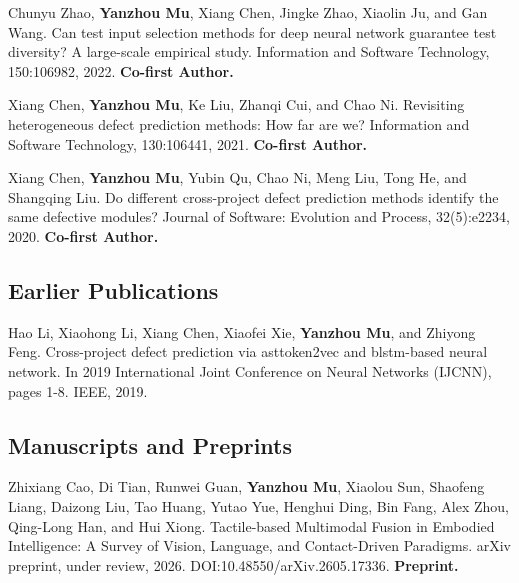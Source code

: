 \documentclass[a4paper,11pt]{article}
\begin{document}
    \vspace{2mm}
    \item {Chunyu Zhao, \textbf{Yanzhou Mu}, Xiang Chen, Jingke Zhao, Xiaolin Ju, and Gan Wang. Can test input selection methods for deep neural network guarantee test diversity? A large-scale empirical study. Information and Software Technology, 150:106982, 2022. \textbf{Co-first Author.}}

    \vspace{2mm}
    \item {Xiang Chen, \textbf{Yanzhou Mu}, Ke Liu, Zhanqi Cui, and Chao Ni. Revisiting heterogeneous defect prediction methods: How far are we? Information and Software Technology, 130:106441, 2021. \textbf{Co-first Author.}}

    \vspace{2mm}
    \item {Xiang Chen, \textbf{Yanzhou Mu}, Yubin Qu, Chao Ni, Meng Liu, Tong He, and Shangqing Liu. Do different cross-project defect prediction methods identify the same defective modules? Journal of Software: Evolution and Process, 32(5):e2234, 2020. \textbf{Co-first Author.}}
    
    \subsection{\textbf{Earlier Publications}}
    \vspace{2mm}
    \item {Hao Li, Xiaohong Li, Xiang Chen, Xiaofei Xie, \textbf{Yanzhou Mu}, and Zhiyong Feng. Cross-project defect prediction via asttoken2vec and blstm-based neural network. In 2019 International Joint Conference on Neural Networks (IJCNN), pages 1-8. IEEE, 2019.}
    
    \vspace{2mm}
    \subsection{\textbf{Manuscripts and Preprints}}
    
    \item {Zhixiang Cao, Di Tian, Runwei Guan, \textbf{Yanzhou Mu}, Xiaolou Sun, Shaofeng Liang, Daizong Liu, Tao Huang, Yutao Yue, Henghui Ding, Bin Fang, Alex Zhou, Qing-Long Han, and Hui Xiong. Tactile-based Multimodal Fusion in Embodied Intelligence: A Survey of Vision, Language, and Contact-Driven Paradigms. arXiv preprint, under review, 2026. DOI:10.48550/arXiv.2605.17336. \textbf{Preprint.}}
\end{document}
